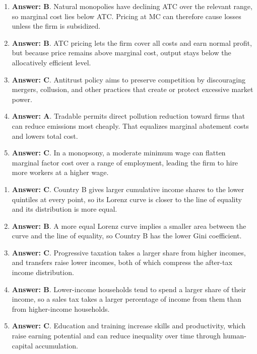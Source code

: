 \documentclass[10pt]{article}
\begin{document}
\begin{enumerate}[resume*=aps, leftmargin=*, itemsep=0.6em, topsep=0.2em, parsep=0pt]
\item \textbf{Answer: B}. Natural monopolies have declining ATC over the relevant range, so marginal cost lies below ATC. Pricing at MC can therefore cause losses unless the firm is subsidized.
\item \textbf{Answer: B}. ATC pricing lets the firm cover all costs and earn normal profit, but because price remains above marginal cost, output stays below the allocatively efficient level.
\item \textbf{Answer: C}. Antitrust policy aims to preserve competition by discouraging mergers, collusion, and other practices that create or protect excessive market power.
\item \textbf{Answer: A}. Tradable permits direct pollution reduction toward firms that can reduce emissions most cheaply. That equalizes marginal abatement costs and lowers total cost.
\item \textbf{Answer: C}. In a monopsony, a moderate minimum wage can flatten marginal factor cost over a range of employment, leading the firm to hire more workers at a higher wage.
\end{enumerate}
\begin{enumerate}[resume*=aps, leftmargin=*, itemsep=0.6em, topsep=0.2em, parsep=0pt]
\item \textbf{Answer: C}. Country B gives larger cumulative income shares to the lower quintiles at every point, so its Lorenz curve is closer to the line of equality and its distribution is more equal.
\item \textbf{Answer: B}. A more equal Lorenz curve implies a smaller area between the curve and the line of equality, so Country B has the lower Gini coefficient.
\item \textbf{Answer: C}. Progressive taxation takes a larger share from higher incomes, and transfers raise lower incomes, both of which compress the after-tax income distribution.
\item \textbf{Answer: B}. Lower-income households tend to spend a larger share of their income, so a sales tax takes a larger percentage of income from them than from higher-income households.
\item \textbf{Answer: C}. Education and training increase skills and productivity, which raise earning potential and can reduce inequality over time through human-capital accumulation.
\end{enumerate}
\end{document}
